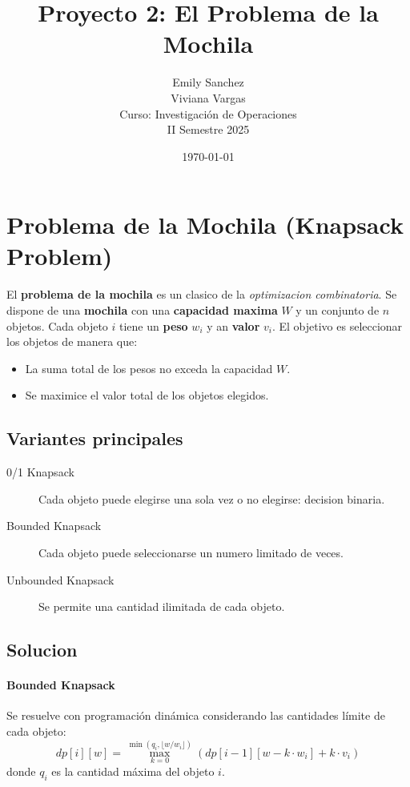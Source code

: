 \documentclass{article}
\title{Proyecto 2: El Problema de la Mochila}
\author{Emily Sanchez \\ Viviana Vargas \\[1cm] Curso: Investigación de Operaciones \\ II Semestre 2025}
\date{\today}
\begin{document}
\maketitle

\thispagestyle{empty}
\newpage
\setcounter{page}{1}

\section{Problema de la Mochila (Knapsack Problem)}

El \textbf{problema de la mochila} es un clasico de la \textit{optimizacion combinatoria}. Se dispone de una \textbf{mochila} con una \textbf{capacidad maxima} $W$ y un conjunto de $n$ objetos. Cada objeto $i$ tiene un \textbf{peso} $w_i$ y an \textbf{valor} $v_i$. El objetivo es seleccionar los objetos de manera que:
\begin{itemize}
  \item La suma total de los pesos no exceda la capacidad $W$.
  \item Se maximice el valor total de los objetos elegidos.
\end{itemize}

\subsection{Variantes principales}
\begin{description}
  \item[0/1 Knapsack] Cada objeto puede elegirse una sola vez o no elegirse: decision binaria.
  \item[Bounded Knapsack] Cada objeto puede seleccionarse un numero limitado de veces.
  \item[Unbounded Knapsack] Se permite una cantidad ilimitada de cada objeto.
\end{description}

\subsection{Solucion}
\paragraph{Bounded Knapsack} Se resuelve con programación dinámica considerando las cantidades límite de cada objeto:
\[
dp[i][w] = \max_{k=0}^{\min(q_i, \lfloor w/w_i \rfloor)} \left( dp[i-1][w - k \cdot w_i] + k \cdot v_i \right)
\]
donde $q_i$ es la cantidad máxima del objeto $i$.
\end{document}
